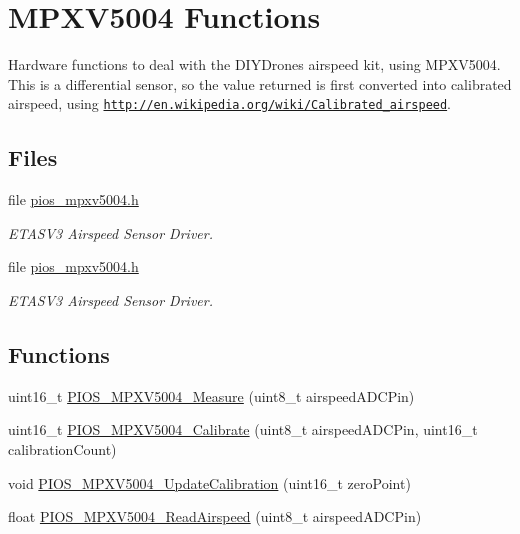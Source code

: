 \hypertarget{group___p_i_o_s___m_p_x_v5004}{\section{\-M\-P\-X\-V5004 \-Functions}
\label{group___p_i_o_s___m_p_x_v5004}
}


\-Hardware functions to deal with the \-D\-I\-Y\-Drones airspeed kit, using \-M\-P\-X\-V5004. \-This is a differential sensor, so the value returned is first converted into calibrated airspeed, using \href{http://en.wikipedia.org/wiki/Calibrated_airspeed}{\tt http\-://en.\-wikipedia.\-org/wiki/\-Calibrated\-\_\-airspeed}.  


\subsection*{\-Files}
\begin{DoxyCompactItemize}
\item 
file \hyperlink{pios__mpxv5004_8h}{pios\-\_\-mpxv5004.\-h}
\begin{DoxyCompactList}\small\item\em \-E\-T\-A\-S\-V3 \-Airspeed \-Sensor \-Driver. \end{DoxyCompactList}\item 
file \hyperlink{pios__mpxv5004_8h}{pios\-\_\-mpxv5004.\-h}
\begin{DoxyCompactList}\small\item\em \-E\-T\-A\-S\-V3 \-Airspeed \-Sensor \-Driver. \end{DoxyCompactList}\end{DoxyCompactItemize}
\subsection*{\-Functions}
\begin{DoxyCompactItemize}
\item 
uint16\-\_\-t \hyperlink{group___p_i_o_s___m_p_x_v5004_ga9d1a16484451fe9fa859327b682d1765}{\-P\-I\-O\-S\-\_\-\-M\-P\-X\-V5004\-\_\-\-Measure} (uint8\-\_\-t airspeed\-A\-D\-C\-Pin)
\item 
uint16\-\_\-t \hyperlink{group___p_i_o_s___m_p_x_v5004_ga19180270b31548797abd9fa9ab186ea8}{\-P\-I\-O\-S\-\_\-\-M\-P\-X\-V5004\-\_\-\-Calibrate} (uint8\-\_\-t airspeed\-A\-D\-C\-Pin, uint16\-\_\-t calibration\-Count)
\item 
void \hyperlink{group___p_i_o_s___m_p_x_v5004_gabee93eb3cfa3b209d265726ca2619e67}{\-P\-I\-O\-S\-\_\-\-M\-P\-X\-V5004\-\_\-\-Update\-Calibration} (uint16\-\_\-t zero\-Point)
\item 
float \hyperlink{group___p_i_o_s___m_p_x_v5004_ga04bd08ddc5bad453125a67cdde7446a5}{\-P\-I\-O\-S\-\_\-\-M\-P\-X\-V5004\-\_\-\-Read\-Airspeed} (uint8\-\_\-t airspeed\-A\-D\-C\-Pin)
\end{DoxyCompactItemize}


